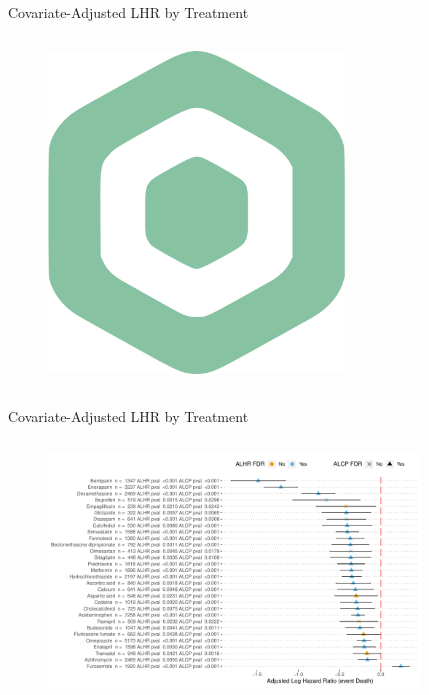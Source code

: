 \documentclass[compress,ignorenonframetext,aspectratio=1610]{beamer}
\begin{document}
\begin{frame}{Covariate-Adjusted LHR by Treatment}
\begin{columns}
		\begin{figure}
			\includegraphics[width=0.7\textwidth]{figs/logos/logo-vectorizado-crop.pdf}	
		\end{figure}

	\end{columns}
\end{frame}


\begin{frame}{Covariate-Adjusted LHR by Treatment}
	\begin{columns}
		\begin{figure}
			\includegraphics[width=0.88\textwidth]{figs/results/bps_covid_repurposing_summary.pdf}
		\end{figure}

	\end{columns}
\end{frame}
\end{document}
